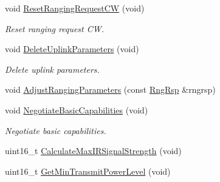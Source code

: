 \begin{DoxyCompactItemize}
void \hyperlink{classns3_1_1SSLinkManager_a9eb4c92a089cd9960bce5e24bba64ed1}{Reset\+Ranging\+Request\+CW} (void)
\begin{DoxyCompactList}\small\item\em Reset ranging request CW. \end{DoxyCompactList}\item 
void \hyperlink{classns3_1_1SSLinkManager_a0b3a123874557b7aec1d4b550530213b}{Delete\+Uplink\+Parameters} (void)
\begin{DoxyCompactList}\small\item\em Delete uplink parameters. \end{DoxyCompactList}\item 
void \hyperlink{classns3_1_1SSLinkManager_a04e92e6521c11d279b3aff2ef73ce7d4}{Adjust\+Ranging\+Parameters} (const \hyperlink{classns3_1_1RngRsp}{Rng\+Rsp} \&rngrsp)
\item 
void \hyperlink{classns3_1_1SSLinkManager_adaff3605d2ba2cd498ad14adbccefb5d}{Negotiate\+Basic\+Capabilities} (void)
\begin{DoxyCompactList}\small\item\em Negotiate basic capabilities. \end{DoxyCompactList}\item 
uint16\+\_\+t \hyperlink{classns3_1_1SSLinkManager_a20ff29424fb97fb9ee82fbac0b0fdd8f}{Calculate\+Max\+I\+R\+Signal\+Strength} (void)
\item 
uint16\+\_\+t \hyperlink{classns3_1_1SSLinkManager_a26beb8548a4cb2908d5b3e660e0f8699}{Get\+Min\+Transmit\+Power\+Level} (void)
\end{DoxyCompactItemize}
